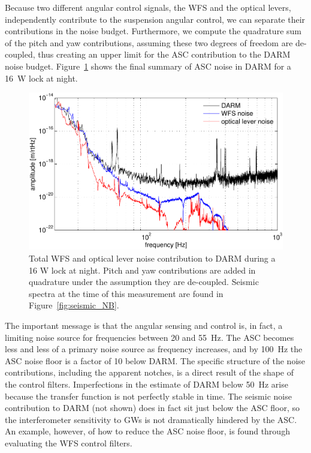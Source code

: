Because two different angular control signals, the WFS and the optical
levers, independently contribute to the suspension angular control, we
can separate their contributions in the noise budget. Furthermore, we
compute the quadrature sum of the pitch and yaw contributions,
assuming these two degrees of freedom are de-coupled, thus creating an
upper limit for the ASC contribution to the DARM noise
budget. Figure~\ref{fig:asc2darm} shows the final summary of ASC noise
in DARM for a 16~W lock at night.

\begin{figure}
\begin{centering}
\includegraphics[width=1.0\columnwidth]{figures/ASC2DARM.pdf}
\caption[Total WFS and optical lever noise contribution to DARM during
a 16 W lock at night]{Total WFS and optical lever noise contribution
  to DARM during a 16 W lock at night. Pitch and yaw contributions are
  added in quadrature under the assumption they are
  de-coupled. Seismic spectra at the time of this measurement are found
  in Figure~\ref{fig:seismic_NB}.}
\label{fig:asc2darm}
\end{centering}
\end{figure}

The important message is that the angular sensing and control is, in
fact, a limiting noise source for frequencies between 20 and
55~Hz. The ASC becomes less and less of a primary noise source as
frequency increases, and by 100~Hz the ASC noise floor is a factor of
10 below DARM. The specific structure of the noise contributions,
including the apparent notches, is a direct result of the shape of the
control filters. Imperfections in the estimate of DARM below 50~Hz
arise because the transfer function is not perfectly stable in time.
The seismic noise contribution to DARM (not shown) does in fact sit
just below the ASC floor, so the interferometer sensitivity to GWs is
not dramatically hindered by the ASC. An example, however, of how to
reduce the ASC noise floor, is found through evaluating the WFS
control filters.



